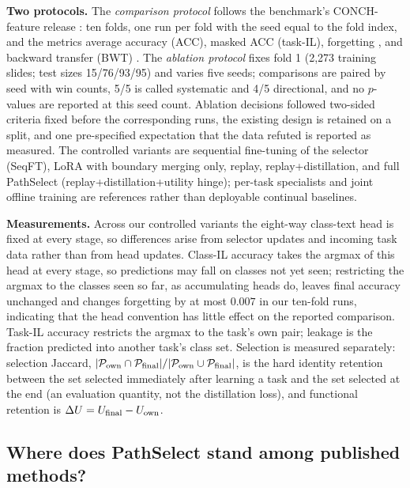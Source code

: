 \documentclass{article}
\newcommand{\Psel}{\mathcal{P}}
\begin{document}
\textbf{Two protocols.}
The \emph{comparison protocol} follows the benchmark's CONCH-feature release \cite{gou2025qpmil}: ten folds, one run per fold with the seed equal to the fold index, and the metrics average accuracy (ACC), masked ACC (task-IL), forgetting \cite{chaudhry2018rwalk}, and backward transfer (BWT) \cite{lopezpaz2017gem}. The \emph{ablation protocol} fixes fold 1 (2,273 training slides; test sizes 15/76/93/95) and varies five seeds; comparisons are paired by seed with win counts, 5/5 is called systematic and 4/5 directional, and no $p$-values are reported at this seed count. Ablation decisions followed two-sided criteria fixed before the corresponding runs, the existing design is retained on a split, and one pre-specified expectation that the data refuted is reported as measured. The controlled variants are sequential fine-tuning of the selector (SeqFT), LoRA with boundary merging only, replay, replay+distillation, and full PathSelect (replay+distillation+utility hinge); per-task specialists and joint offline training are references rather than deployable continual baselines.

\textbf{Measurements.}
Across our controlled variants the eight-way class-text head is fixed at every stage, so differences arise from selector updates and incoming task data rather than from head updates. Class-IL accuracy takes the argmax of this head at every stage, so predictions may fall on classes not yet seen; restricting the argmax to the classes seen so far, as accumulating heads do, leaves final accuracy unchanged and changes forgetting by at most $0.007$ in our ten-fold runs, indicating that the head convention has little effect on the reported comparison. Task-IL accuracy restricts the argmax to the task's own pair; leakage is the fraction predicted into another task's class set. Selection is measured separately: selection Jaccard, $|\Psel_{\rm own}\cap\Psel_{\rm final}|/|\Psel_{\rm own}\cup\Psel_{\rm final}|$, is the hard identity retention between the set selected immediately after learning a task and the set selected at the end (an evaluation quantity, not the distillation loss), and functional retention is $\Delta U=U_{\rm final}-U_{\rm own}$.

\subsection{Where does PathSelect stand among published methods?}
\label{ssec:sota}
\end{document}
